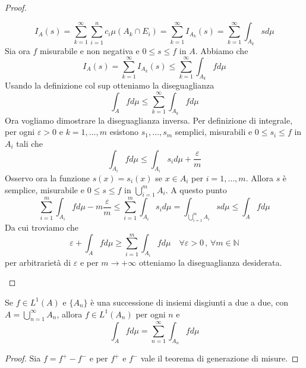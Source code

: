 \begin{proof}
\begin{enumerate}[label = \arabic*.]
            \[
                I_A(s) = \sum_{k=1}^{\infty} \sum_{i=1}^{n} c_{i} \mu(A_k \cap
                E_{i}) = \sum_{k=1}^{\infty} I_{A_k}(s) = \sum_{k=1}^{\infty}
                \int_{A_k} s d\mu
            \]
            Sia ora \(f\) misurabile e non negativa e \(0 \le s \le f\) in
            \(A\). Abbiamo che
            \[
                I_A(s) = \sum_{k=1}^{\infty} I_{A_k}(s) \le  \sum_{k=1}^{\infty}
                \int_{A_k}  f d\mu
            \]
            Usando la definizione col sup otteniamo la diseguaglianza 
            \[
                \int_{A} f d\mu \le \sum_{k=1}^{\infty} \int_{A_k} f d\mu
            \]
            Ora vogliamo dimostrare la diseguaglianza inversa. Per definizione di integrale, per ogni
            \(\varepsilon>0\) e \(k = 1, \dots, m\) esistono \(s_{1}, \dots,
            s_{m}\) semplici, misurabili e \(0 \le s_{i} \le f\) in \(A_{i}\)
            tali che 
            \[
                \int_{A_{i}} f d\mu \le \int_{A_{i}} s_{i} d\mu +
                \frac{\varepsilon}{m}
            \]
            Osservo ora la funzione \(s(x) = s_{i}(x)\) se \(x \in A_{i}\) per
            \(i = 1, \dots, m\). Allora \(s\) è semplice, misurabile e \(0 \le s
            \le f\) in \(\bigcup_{i=1}^{m} A_{i} \). A questo punto
            \[
                \sum_{i=1}^{m} \int_{A_{i}} f d\mu  - m \frac{\varepsilon}{m}
                \le   \sum_{i=1}^m \int_{A_{i}} s_{i} d\mu =
                \int_{\bigcup_{i=1}^{m} A_{i} } s d\mu \le \int_{A} f d\mu
            \]
            Da cui troviamo che 
            \[
                \varepsilon + \int_{A} f d\mu \ge \sum_{i=1}^{m} \int_{A_{i}} f
                d\mu \quad \forall \varepsilon >0 \,,\, \forall m \in \mathbb{N}
            \]
            per arbitrarietà di \(\varepsilon\) e per \(m \to +\infty\)
            otteniamo la diseguaglianza desiderata.
    \end{enumerate}
\end{proof}
\begin{corollary}
    Se \(f \in L^{1}(A)\) e \(\{A_{n}\}\) è una successione di insiemi
    disgiunti a due a due, con \(A = \bigcup_{n=1}^{\infty} A_{n} \), allora \(f
    \in L^{1}(A_n)\) per ogni \(n\) e
    \[
        \int_{A} f d\mu = \sum_{n=1}^{\infty}
        \int_{A_{n}} f d\mu
    \]
\end{corollary}
\begin{proof}
    Sia \(f = f^{+} - f^{-}\) e per \(f^{+}\) e \(f^{-}\) vale il teorema di
    generazione di misure.
\end{proof}

